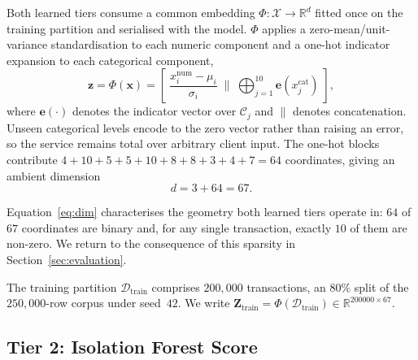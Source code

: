 \documentclass[conference]{IEEEtran}
\begin{document}
Both learned tiers consume a common embedding
$\Phi:\mathcal{X}\rightarrow\mathbb{R}^{d}$ fitted once on the training
partition and serialised with the model. $\Phi$ applies a
zero-mean/unit-variance standardisation to each numeric component and a
one-hot indicator expansion to each categorical component,
\begin{equation}
\mathbf{z} = \Phi(\mathbf{x}) =
\left[\;
  \frac{x^{\mathrm{num}}_{i}-\mu_{i}}{\sigma_{i}}
  \;\Big\|\;
  \bigoplus_{j=1}^{10}\mathbf{e}\!\left(x^{\mathrm{cat}}_{j}\right)
\;\right],
\label{eq:phi}
\end{equation}
where $\mathbf{e}(\cdot)$ denotes the indicator vector over
$\mathcal{C}_{j}$ and $\|$ denotes concatenation. Unseen categorical
levels encode to the zero vector rather than raising an error, so the
service remains total over arbitrary client input. The one-hot blocks
contribute $4+10+5+5+10+8+8+3+4+7 = 64$ coordinates, giving an ambient
dimension
\begin{equation}
d = 3 + 64 = 67 .
\label{eq:dim}
\end{equation}

Equation~\eqref{eq:dim} characterises the geometry both learned tiers
operate in: $64$ of $67$ coordinates are binary and, for any single
transaction, exactly $10$ of them are non-zero. We return to the
consequence of this sparsity in Section~\ref{sec:evaluation}.

The training partition $\mathcal{D}_{\mathrm{train}}$ comprises
$200{,}000$ transactions, an $80\%$ split of the $250{,}000$-row corpus
under seed~$42$. We write
$\mathbf{Z}_{\mathrm{train}} = \Phi(\mathcal{D}_{\mathrm{train}})
\in \mathbb{R}^{200000\times 67}$.

\subsection{Tier 2: Isolation Forest Score}
\label{subsec:iforest}
\end{document}
